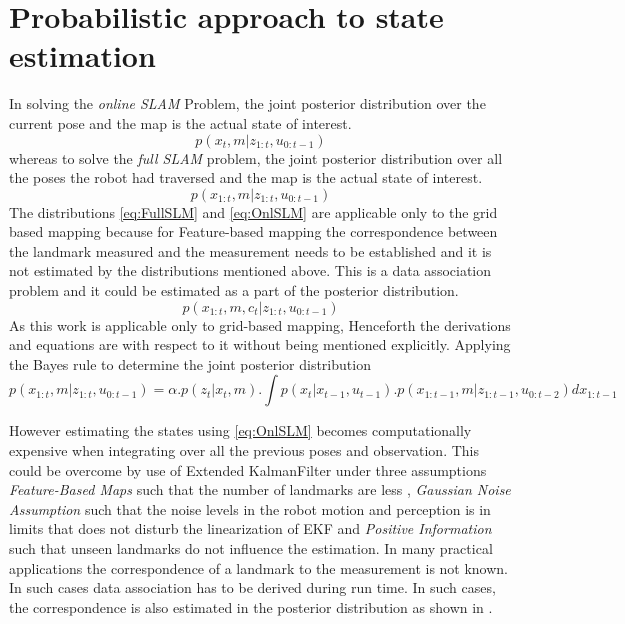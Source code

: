 \section{Probabilistic approach to state estimation}
    In solving the \textit{online SLAM} Problem, the joint posterior distribution over the current pose and the map is the actual state of interest.
\begin{equation} \label{eq:OnlSLM}
    p(x_t, m | z_{1:t}, u_{0:t-1})
\end{equation}
whereas to solve the \textit{full SLAM }problem, the joint posterior distribution over  all the poses the robot had traversed and the map is the actual state of interest.
\begin{equation} \label{eq:FullSLM}
    p(x_{1:t}, m | z_{1:t}, u_{0:t-1})
\end{equation}
The distributions \ref{eq:FullSLM} and \ref{eq:OnlSLM} are applicable only to the grid based mapping because for Feature-based mapping the correspondence between the landmark measured and the measurement needs to be established and it is not estimated by the distributions mentioned above. This is a data association problem and it could be estimated as a part of the posterior distribution.
\begin{equation} \label{CorresSLM}
    p(x_{1:t}, m, c_t | z_{1:t}, u_{0:t-1})
\end{equation}
As this work is applicable only to grid-based mapping, Henceforth the derivations and equations are with respect to it without being mentioned explicitly.
Applying the Bayes rule to determine the joint posterior distribution 
\begin{equation} \label{eq:FullSLMc}
    p(x_{1:t}, m | z_{1:t}, u_{0:t-1}) = \alpha . p(z_t | x_t, m).\int p(x_t| x_{t-1}, u_{t-1}). p(x_{1:t-1}, m | z_{1:t-1}, u_{0:t-2}) dx_{1:t-1}
\end{equation}
\par

However estimating the states using \ref{eq:OnlSLM} becomes computationally expensive when integrating over all the previous poses and observation. This could be overcome by use of Extended KalmanFilter under three assumptions \textit{Feature-Based Maps} such that the number of landmarks are less , \textit{Gaussian Noise Assumption} such that the noise levels in the robot motion and perception is in limits that does not disturb the linearization of EKF and \textit{ Positive Information} such that unseen landmarks do not influence the estimation. In many practical applications the correspondence of a landmark to the measurement is not known. In such cases data association has to be derived during run time. In such cases, the correspondence is also estimated in the posterior distribution as shown in .

